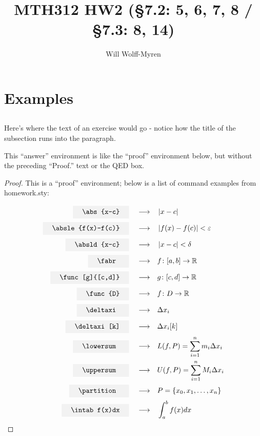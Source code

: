 \documentclass{article}
\title{MTH312 HW2 (\S7.2: 5, 6, 7, 8 /  \S7.3: 8, 14) }
\author{Will Wolff-Myren}
\begin{document}
\section{Examples}

\subsection{}
Here's where the text of an exercise would go - notice how the title of the subsection runs into the paragraph.

    
    \begin{answer}
        This ``answer'' environment is like the ``proof'' environment below, 
        but without the preceding ``Proof.'' text or the QED box.
    \end{answer}

    \begin{proof}
    
        This is a ``proof'' environment; below is a list of command examples from homework.sty:
    
        \begin{align*}
            \cop{\abs{x-c}} \\
            \cop{\absle{f(x)-f(c)}} \\
            \cop{\absld{x-c}} \\
            \cop{\fabr} \\
            \cop{\func[g]{[c,d]}} \\
            \cop{\func{D}} \\
            \cop{\deltaxi} \\
            \cop{\deltaxi[k]} \\
            \cop{\lowersum} \\
            \cop{\uppersum} \\
            \cop{\partition} \\
            \cop{\intab f(x)dx} \\
        \end{align*}
    
    \end{proof}
\end{document}
